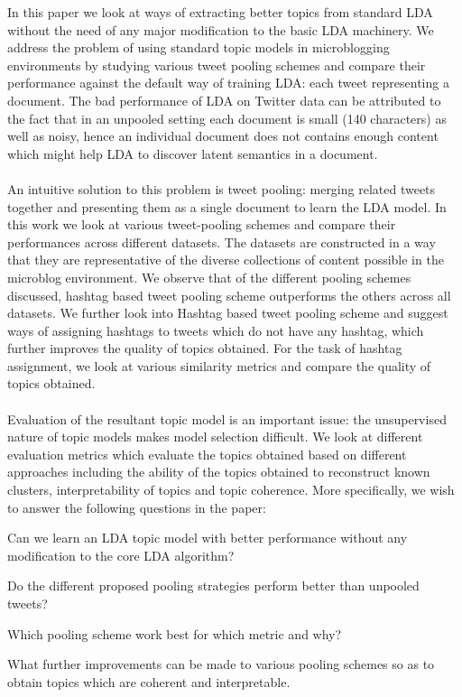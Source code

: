 \documentclass[10pt,a5paper,twoside]{article}
\begin{document}
In this paper we look at ways of extracting better topics from standard LDA without the need of any major modification to the basic LDA machinery. We address the problem of using standard topic models in microblogging environments by studying various tweet pooling schemes and compare their performance against the default way of training LDA: each tweet representing a document. The bad performance of LDA on Twitter data can be attributed to the fact that in an unpooled setting each document is small (140 characters) as well as noisy, hence an individual document does not contains enough content which might help LDA to discover latent semantics in a document.
\\\\
An intuitive solution to this problem is tweet pooling: merging related tweets together and presenting them as a single document to learn the LDA model. In this work we look at various tweet-pooling schemes and compare their performances across different datasets. The datasets are constructed in a way that they are representative of the diverse collections of content possible in the microblog environment. %
We observe that of the different pooling schemes discussed, hashtag based tweet pooling scheme outperforms the others across all datasets. We further look into Hashtag based tweet pooling scheme and suggest ways of assigning hashtags to tweets which do not have any hashtag, which further improves the quality of topics obtained. For the task of hashtag assignment, we look at various similarity metrics and compare the quality of topics obtained.
\\\\
Evaluation of the resultant topic model is an important issue: the unsupervised nature of topic models makes model selection difficult. We look at different evaluation metrics which evaluate the topics obtained based on different approaches including the ability of the topics obtained to reconstruct known clusters, interpretability of topics and topic coherence. More specifically, we wish to answer the following questions in the paper:
\begin{compactitem}
\item  Can we learn an LDA topic model with better performance without any modification to the core LDA algorithm?
\item Do the different proposed pooling strategies perform better than unpooled tweets?
\item Which pooling scheme work best for which metric and why?
\item What further improvements can be made to various pooling schemes so as to obtain topics which are coherent and interpretable.
\end{compactitem}
\end{document}
